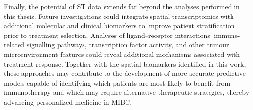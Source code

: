 Finally, the potential of ST data extends far beyond the analyses performed in this thesis. Future investigations could integrate spatial transcriptomics with additional molecular and clinical biomarkers to improve patient stratification prior to treatment selection. Analyses of ligand--receptor interactions, immune-related signalling pathways, transcription factor activity, and other tumour microenvironment features could reveal additional mechanisms associated with treatment response. Together with the spatial biomarkers identified in this work, these approaches may contribute to the development of more accurate predictive models capable of identifying which patients are most likely to benefit from immunotherapy and which may require alternative therapeutic strategies, thereby advancing personalized medicine in MIBC.


